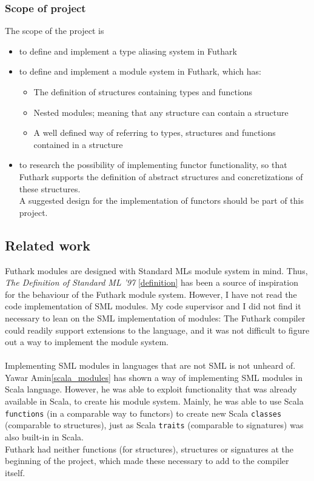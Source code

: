 \subsubsection{Scope of project}
\label{subsec:project_scope}
The scope of the project is
\begin{itemize}
  \item to define and implement a type aliasing system in Futhark
  \item to define and implement a module system in Futhark, which has:
    \begin{itemize}
      \item The definition of structures containing types and functions
      \item Nested modules; meaning that any structure can contain a structure
      \item A well defined way of referring to types, structures and functions
        contained in a structure
    \end{itemize}
  \item to research the possibility of implementing functor functionality, so that Futhark supports the
    definition of abstract structures and concretizations of these structures.
    \\    A suggested design for the implementation of functors should be part of this project.
\end{itemize}
\clearpage

\subsection{Related work}
Futhark modules are designed with Standard MLs module system in mind. Thus, \textit{The
Definition of Standard ML '97} \ref{definition} has been a source of inspiration
for the behaviour of the Futhark module system. However, I have not read the
code implementation of SML modules. My code supervisor and I did not find it
necessary to lean on the SML implementation of modules: The Futhark compiler
could readily support extensions to the language, and it was not difficult to
figure out a way to implement the module system.
\\
\\
Implementing SML modules in languages that are not SML is not unheard of. Yawar
Amin\ref{scala_modules} has shown a way of implementing SML modules in Scala
language.
However, he was able to exploit functionality that was already available in
Scala, to create his module system. Mainly, he was able to use Scala
\texttt{functions} (in a comparable way to functors) to create new Scala
\texttt{classes} (comparable to structures), just as Scala
\texttt{traits} (comparable to signatures) was also built-in in Scala.\\
Futhark had neither functions (for structures), structures or signatures at the
beginning of the project, which made these necessary to add to the compiler itself.